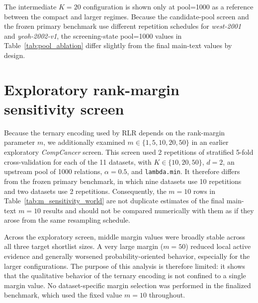 \documentclass[11pt, a4paper]{article}
\begin{document}
The intermediate $K=20$ configuration is shown only at pool=1000 as a reference between the compact and larger regimes. Because the candidate-pool screen and the frozen primary benchmark use different repetition schedules for \emph{west-2001} and \emph{yeoh-2002-v1}, the screening-state pool=1000 values in Table~\ref{tab:pool_ablation} differ slightly from the final main-text values by design.


\section{Exploratory rank-margin sensitivity screen}

Because the ternary encoding used by RLR depends on the rank-margin parameter $m$, we additionally examined $m\in\{1,5,10,20,50\}$ in an earlier exploratory \emph{CompCancer} screen. This screen used 2 repetitions of stratified 5-fold cross-validation for each of the 11 datasets, with $K\in\{10,20,50\}$, $d=2$, an upstream pool of 1000 relations, $\alpha=0.5$, and \texttt{lambda.min}. It therefore differs from the frozen primary benchmark, in which nine datasets use 10 repetitions and two datasets use 2 repetitions. Consequently, the $m=10$ rows in Table~\ref{tab:m_sensitivity_world} are not duplicate estimates of the final main-text $m=10$ results and should not be compared numerically with them as if they arose from the same resampling schedule.

Across the exploratory screen, middle margin values were broadly stable across all three target shortlist sizes. A very large margin ($m=50$) reduced local active evidence and generally worsened probability-oriented behavior, especially for the larger configurations. The purpose of this analysis is therefore limited: it shows that the qualitative behavior of the ternary encoding is not confined to a single margin value. No dataset-specific margin selection was performed in the finalized benchmark, which used the fixed value $m=10$ throughout.
\end{document}
